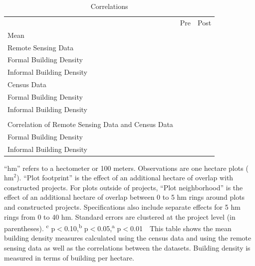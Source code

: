 \documentclass[12pt]{article}
\newcommand{\regtextfirst}{
	``hm'' refers to a hectometer or 100 meters. Observations are one hectare plots ($\text{hm}^{2}$).
``Plot footprint'' is the effect of an additional hectare of overlap with constructed projects.  
For plots outside of projects, ``Plot neighborhood'' is the effect of an additional hectare of overlap between 0 to 5 hm rings around plots and constructed projects.  Specifications also include separate effects for 5 hm rings from 0 to 40 hm.
Standard errors are clustered at the project level (in parentheses). 
\textsuperscript{c} p$<$0.10,\textsuperscript{b} p$<$0.05,\textsuperscript{a} p$<$0.01 \,\,
}
\begin{document}
\begin{table}[ht!]
\small
\centering
\caption{Correlations }\label{table:densitycorr}
\vspace{-2mm}
\begin{threeparttable}
\begin{tabular}{lCC}
\toprule
 &Pre & Post \\
Mean &  & \\
\midrule
Remote Sensing Data  \\
\hspace{1cm} Formal Building Density&  &  \\
\hspace{1cm} Informal Building Density &  &  \\
Census Data  \\
\hspace{1cm} Formal Building Density&  &  \\
\hspace{1cm} Informal Building Density &  &  \\
\\
Correlation of Remote Sensing Data and Census Data \\
\midrule
\hspace{1cm} Formal Building Density &  &  \\
\hspace{1cm} Informal Building Density &  &  \\
\bottomrule
\end{tabular}
\begin{tablenotes}
\item \footnotesize 
 \regtextfirst This table shows the mean building density measures calculated using the census data and using the remote sensing data as well as the correlations between the datasets.  Building density is measured in terms of building per hectare.
\end{tablenotes}
\end{threeparttable}
\end{table}





% 
\end{document}
